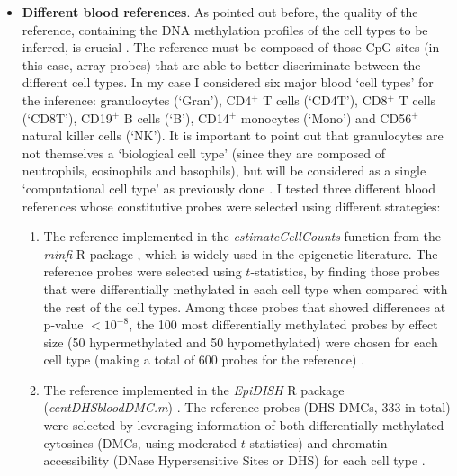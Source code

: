 \begin{itemize}
	
	\item \textbf{Different blood references}. As pointed out before, the quality of the reference, containing the DNA methylation profiles of the cell types to be inferred, is crucial \citep{Teschendorff2017a,Koestler2016}. The reference must be composed of those CpG sites (in this case, array probes) that are able to better discriminate between the different cell types. In my case I considered six major blood `cell types' for the inference: granulocytes (`\acrshort{Gran}'), CD4$^+$ T cells (`\acrshort{CD4T}'), CD8$^+$ T cells (`\acrshort{CD8T}'), CD19$^+$ B cells (`\acrshort{B}'), CD14$^+$ monocytes (`\acrshort{Mono}') and  CD56$^+$ natural killer cells (`\acrshort{NK}'). It is important to point out that granulocytes are not themselves a `biological cell type' (since they are composed of neutrophils, eosinophils and basophils), but will be considered as a single `computational cell type' as previously done \citep{Chen2016,Horvath2016}. I tested three different blood references whose constitutive probes were selected using different strategies:
	
	\begin{enumerate}
		
		\item The reference implemented in the \textit{estimateCellCounts} function from the \textit{minfi} R package \citep{Aryee2014}, which is widely used in the epigenetic literature. The reference probes were selected using $t$-statistics, by finding those probes that were differentially methylated in each cell type when compared with the rest of the cell types. Among those probes that showed differences at p-value $< 10^{-8}$, the 100 most differentially methylated probes by effect size (50 hypermethylated and 50 hypomethylated) were chosen for each cell type (making a total of 600 probes for the reference) \citep{Jaffe2014}. 
		
		\smallskip
		
		\item The reference implemented in the \textit{EpiDISH} R package (\textit{centDHSbloodDMC.m}) \citep{Teschendorff2017b}. The reference probes (\acrshort{DHS-DMCs}, 333 in total) were selected by leveraging information of both differentially methylated cytosines (\acrshort{DMCs}, using moderated $t$-statistics) and chromatin accessibility (DNase Hypersensitive Sites or \acrshort{DHS}) for each cell type \citep{Teschendorff2017a}.  
		

\end{enumerate}
\end{itemize}
